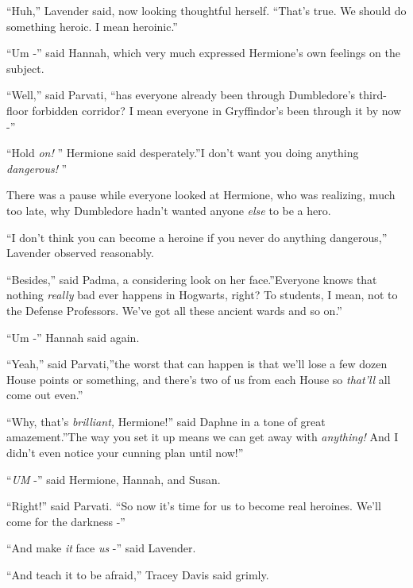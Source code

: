``Huh,'' Lavender said, now looking thoughtful herself. ``That's true.
We should do something heroic. I mean heroinic.''

``Um -'' said Hannah, which very much expressed Hermione's own feelings
on the subject.

``Well,'' said Parvati, ``has everyone already been through Dumbledore's
third-floor forbidden corridor? I mean everyone in Gryffindor's been
through it by now -''

``Hold \emph{on!} '' Hermione said desperately.''I don't want you doing
anything \emph{dangerous!} ''

There was a pause while everyone looked at Hermione, who was realizing,
much too late, why Dumbledore hadn't wanted anyone \emph{else} to be a
hero.

``I don't think you can become a heroine if you never do anything
dangerous,'' Lavender observed reasonably.

``Besides,'' said Padma, a considering look on her face.''Everyone knows
that nothing \emph{really} bad ever happens in Hogwarts, right? To
students, I mean, not to the Defense Professors. We've got all these
ancient wards and so on.''

``Um -'' Hannah said again.

``Yeah,'' said Parvati,''the worst that can happen is that we'll lose a
few dozen House points or something, and there's two of us from each
House so \emph{that'll} all come out even.''

``Why, that's \emph{brilliant,} Hermione!'' said Daphne in a tone of
great amazement.''The way you set it up means we can get away with
\emph{anything!} And I didn't even notice your cunning plan until now!''

``\emph{UM} -'' said Hermione, Hannah, and Susan.

``Right!'' said Parvati. ``So now it's time for us to become real
heroines. We'll come for the darkness -''

``And make \emph{it} face \emph{us} -'' said Lavender.

``And teach it to be afraid,'' Tracey Davis said grimly.
